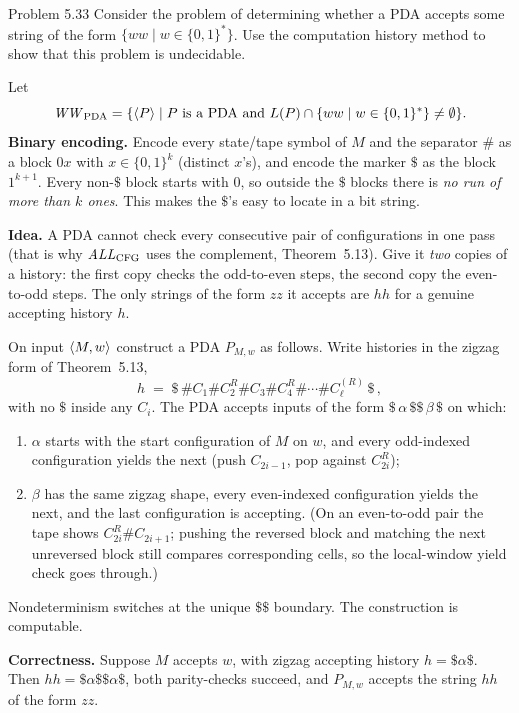 \begin{question}{Problem 5.33}
Consider the problem of determining whether a PDA accepts some string of the form $\{ww\mid w\in\{0,1\}^*\}$. Use the computation history method to show that this problem is undecidable.
\end{question}
\begin{soln}
Let
\[
\mathit{WW}_{\mathrm{PDA}}=\{\langle P\rangle\mid P\text{ is a PDA and }L(P)\cap\{ww\mid w\in\{0,1\}^*\}\neq\emptyset\}.
\]
\textbf{Binary encoding.} Encode every state/tape symbol of $M$ and the separator $\#$ as a block $0x$ with $x\in\{0,1\}^k$ (distinct $x$'s), and encode the marker $\$$ as the block $1^{k+1}$. Every non-$\$$ block starts with $0$, so outside the $\$$ blocks there is \emph{no run of more than $k$ ones}. This makes the $\$$'s easy to locate in a bit string.

\textbf{Idea.} A PDA cannot check every consecutive pair of configurations in one pass (that is why $\mathit{ALL}_{\mathrm{CFG}}$ uses the complement, Theorem~5.13). Give it \emph{two} copies of a history: the first copy checks the odd-to-even steps, the second copy the even-to-odd steps. The only strings of the form $zz$ it accepts are $hh$ for a genuine accepting history $h$.

On input $\langle M,w\rangle$ construct a PDA $P_{M,w}$ as follows. Write histories in the zigzag form of Theorem~5.13,
\[
h \;=\; \$\,\#C_1\#C_2^R\#C_3\#C_4^R\#\cdots\#C_\ell^{(R)}\,\$\,,
\]
with no $\$$ inside any $C_i$. The PDA accepts inputs of the form $\$\,\alpha\,\$\$\,\beta\,\$$ on which:
\begin{enumerate}
\item $\alpha$ starts with the start configuration of $M$ on $w$, and every odd-indexed configuration yields the next (push $C_{2i-1}$, pop against $C_{2i}^R$);
\item $\beta$ has the same zigzag shape, every even-indexed configuration yields the next, and the last configuration is accepting. (On an even-to-odd pair the tape shows $C_{2i}^R\#C_{2i+1}$; pushing the reversed block and matching the next unreversed block still compares corresponding cells, so the local-window yield check goes through.)
\end{enumerate}
Nondeterminism switches at the unique $\$\$$ boundary. The construction is computable.

\textbf{Correctness.} Suppose $M$ accepts $w$, with zigzag accepting history $h=\$\alpha\$$. Then $hh=\$\alpha\$\$\alpha\$$, both parity-checks succeed, and $P_{M,w}$ accepts the string $hh$ of the form $zz$.


\end{soln}
